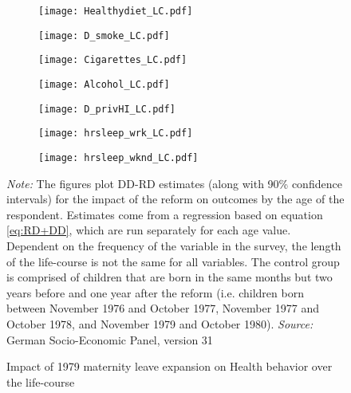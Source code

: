 \documentclass[a4paper ]{article}
\begin{document}
\newpage
\begin{figure}[p]
\begin{subfigure}[h]{0.48\textwidth}\centering
	\texttt{[image: Healthydiet\_LC.pdf]}
\end{subfigure}
\quad
\begin{subfigure}[h]{0.48\textwidth}\centering
	\texttt{[image: D\_smoke\_LC.pdf]}
\end{subfigure}

\begin{subfigure}[h]{0.48\textwidth}\centering
	\texttt{[image: Cigarettes\_LC.pdf]}
\end{subfigure}
\quad
\begin{subfigure}[h]{0.48\textwidth}\centering
	\texttt{[image: Alcohol\_LC.pdf]}
\end{subfigure}



\begin{subfigure}[h]{0.48\textwidth}\centering
	\texttt{[image: D\_privHI\_LC.pdf]}
\end{subfigure}
\quad
\begin{subfigure}[h]{0.48\textwidth}\centering
	\texttt{[image: hrsleep\_wrk\_LC.pdf]}
\end{subfigure}

\begin{subfigure}[h]{0.48\textwidth}\centering
	\texttt{[image: hrsleep\_wknd\_LC.pdf]}
\end{subfigure}


\caption{Impact of 1979 maternity leave expansion on Health behavior over the life-course}\label{fig: LC_HB}
\begin{minipage}{\textwidth} %
{\footnotesize \textit{Note:} The figures plot DD-RD estimates (along with 90\% confidence intervals) for the impact of the reform on outcomes by the age of the respondent. Estimates come from a regression based on equation \ref{eq:RD+DD}, which are run separately for each age value. Dependent on the frequency of the variable in the survey, the length of the life-course is not the same for all variables. The control group is comprised of children that are born in the same months but two years before and one year after the reform (i.e. children born between November 1976 and October 1977, November 1977 and October 1978, and November 1979 and October 1980). \newline \textit{Source: }German Socio-Economic Panel, version 31\par}
\end{minipage}
\end{figure}
\end{document}
